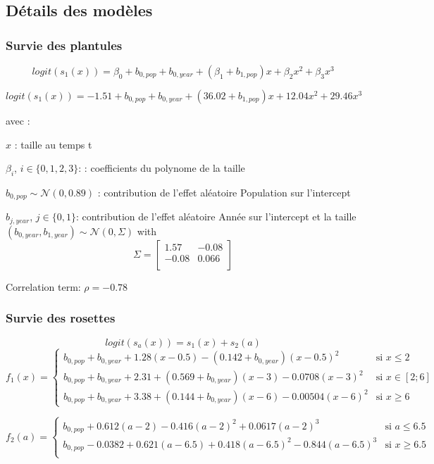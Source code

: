 \documentclass[
]{article}
\begin{document}
\subsection{Détails des modèles}\label{duxe9tails-des-moduxe8les}

\subsubsection{Survie des plantules}\label{survie-des-plantules}

\[logit(s_1(x))=\beta_0+b_{0,pop}+b_{0,year}+(\beta_1+b_{1,pop})x+\beta_2x^2+\beta_3x^3\]

\[logit(s_1(x))=-1.51+b_{0,pop}+b_{0,year}+(36.02+b_{1,pop})x+12.04x^2+29.46x^3\]

avec :

\(x\) : taille au temps t

\(\beta_i\), \(i\in\{0,1,2,3\}\): : coefficients du polynome de la
taille

\(b_{0,pop} \sim \mathcal{N}(0,0.89)\) : contribution de l'effet
aléatoire Population sur l'intercept

\(b_{j,year}\), \(j\in\{0,1\}\): contribution de l'effet aléatoire Année
sur l'intercept et la taille
\((b_{0,year},b_{1,year}) \sim \mathcal{N}(0,\Sigma)\) with \[\Sigma =
  \left[ {\begin{array}{cc}
    1.57 & -0.08 \\
    -0.08 & 0.066 \\
  \end{array} } \right]\]

Correlation term: \(\rho=-0.78\)

\subsubsection{Survie des rosettes}\label{survie-des-rosettes}

\[logit(s_a(x))=s_1(x)+s_2(a)\] \[f_1(x) = \left\{
    \begin{array}{ll}
        b_{0,pop}+b_{0,year}+1.28(x-0.5)-(0.142+b_{0,year})(x - 0.5) ^ 2 & \mbox{si } x \leq 2 \\
        b_{0,pop}+b_{0,year}+2.31+(0.569+b_{0,year})(x-3)-0.0708(x-3)^2 & \mbox{si } x \in [2;6] \\
        b_{0,pop}+b_{0,year}+3.38 + (0.144+b_{0,year})(x - 6)-0.00504(x-6)^2 & \mbox{si } x \geq 6
    \end{array}
\right.\]

\[f_2(a) = \left\{
    \begin{array}{ll}
        b_{0,pop}+0.612 (a-2) - 0.416 (a-2)^2 + 0.0617 (a-2)^3 & \mbox{si } a \leq 6.5 \\
        b_{0,pop}-0.0382 + 0.621 (a-6.5)+0.418(a-6.5)^2 -0.844(a-6.5)^3 & \mbox{si } x \geq 6.5 \\
    \end{array}
\right.\]
\end{document}
